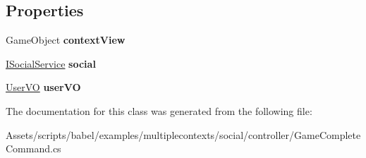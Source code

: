 \subsection*{Properties}
\begin{DoxyCompactItemize}
\item 
\hypertarget{classbabel_1_1examples_1_1multiplecontexts_1_1social_1_1_game_complete_command_a5b407336659821a6582cd2cc5a97b469}{Game\-Object {\bfseries context\-View}}\label{classbabel_1_1examples_1_1multiplecontexts_1_1social_1_1_game_complete_command_a5b407336659821a6582cd2cc5a97b469}

\item 
\hypertarget{classbabel_1_1examples_1_1multiplecontexts_1_1social_1_1_game_complete_command_a7042613531cd97a93d761390cae493ee}{\hyperlink{interfacebabel_1_1examples_1_1multiplecontexts_1_1social_1_1_i_social_service}{I\-Social\-Service} {\bfseries social}}\label{classbabel_1_1examples_1_1multiplecontexts_1_1social_1_1_game_complete_command_a7042613531cd97a93d761390cae493ee}

\item 
\hypertarget{classbabel_1_1examples_1_1multiplecontexts_1_1social_1_1_game_complete_command_ac6e3d394c63ecdfefea8a8015e2dfcdc}{\hyperlink{classbabel_1_1examples_1_1multiplecontexts_1_1social_1_1_user_v_o}{User\-V\-O} {\bfseries user\-V\-O}}\label{classbabel_1_1examples_1_1multiplecontexts_1_1social_1_1_game_complete_command_ac6e3d394c63ecdfefea8a8015e2dfcdc}

\end{DoxyCompactItemize}


The documentation for this class was generated from the following file\-:\begin{DoxyCompactItemize}
\item 
Assets/scripts/babel/examples/multiplecontexts/social/controller/Game\-Complete\-Command.\-cs\end{DoxyCompactItemize}
